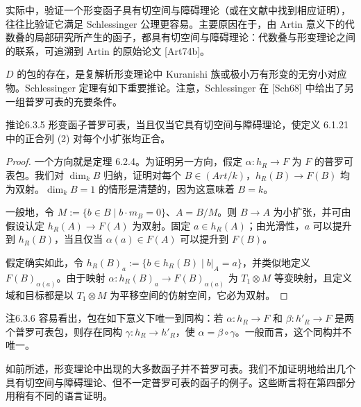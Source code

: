 实际中，验证一个形变函子具有切空间与障碍理论（或在文献中找到相应证明），往往比验证它满足 Schlessinger 公理更容易。主要原因在于，由 Artin 意义下的代数叠的局部研究所产生的函子，都具有切空间与障碍理论：代数叠与形变理论之间的联系，可追溯到 Artin 的原始论文 [Art74b]。

$D$ 的包的存在，是复解析形变理论中 Kuranishi 族或极小万有形变的无穷小对应物。Schlessinger 定理有如下重要推论。注意，Schlessinger 在 [Sch68] 中给出了另一组普罗可表的充要条件。

\begin{origstatement}{推论}{6.3.5}\label{ch06:6.3.5}
形变函子普罗可表，当且仅当它具有切空间与障碍理论，使定义 6.1.21 中的正合列 (2) 对每个小扩张均正合。
\end{origstatement}
\begin{proof}
一个方向就是定理 6.2.4。为证明另一方向，假定 $\alpha:h_R\to F$ 为 $F$ 的普罗可表包。我们对 $\dim_k B$ 归纳，证明对每个 $B\in(Art/k)$，$h_R(B)\to F(B)$ 均为双射。$\dim_k B=1$ 的情形是清楚的，因为这意味着 $B=k$。

一般地，令 $M:=\{b\in B\mid b\cdot m_B=0\}$、$A=B/M$。则 $B\to A$ 为小扩张，并可由假设认定 $h_R(A)\to F(A)$ 为双射。固定 $a\in h_R(A)$；由光滑性，$a$ 可以提升到 $h_R(B)$，当且仅当 $\alpha(a)\in F(A)$ 可以提升到 $F(B)$。

假定确实如此，令 $h_R(B)_a:=\{b\in h_R(B)\mid b|_A=a\}$，并类似地定义 $F(B)_{\alpha(a)}$。由于映射 $\alpha:h_R(B)_a\to F(B)_{\alpha(a)}$ 为 $T_1\otimes M$ 等变映射，且定义域和目标都是以 $T_1\otimes M$ 为平移空间的仿射空间，它必为双射。
\end{proof}
\begin{origstatement}{注}{6.3.6}\label{ch06:6.3.6}
容易看出，包在如下意义下唯一到同构：若 $\alpha:h_R\to F$ 和 $\beta:h'_R\to F$ 是两个普罗可表包，则存在同构 $\gamma:h_R\to h'_R$，使 $\alpha=\beta\circ\gamma$。一般而言，这个同构并不唯一。
\end{origstatement}
如前所述，形变理论中出现的大多数函子并不普罗可表。我们不加证明地给出几个具有切空间与障碍理论、但不一定普罗可表的函子的例子。这些断言将在第四部分用稍有不同的语言证明。

